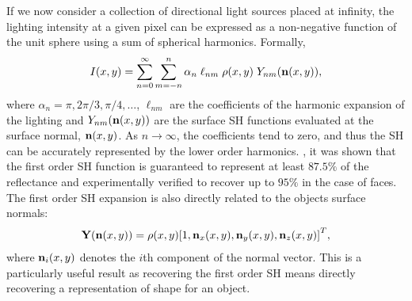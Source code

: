 If we now consider a collection of directional light sources placed at infinity,
the lighting intensity at a given pixel can be expressed as a non-negative
function of the unit sphere using a sum of spherical harmonics. Formally,
\begin{equation}\label{eq:spherical_harmonics}
    I(x, y) = \sum^{\infty}_{n=0} \sum^{n}_{m=-n} \alpha_n \; \ell_{nm} \; \rho(x,y) \; Y_{nm}(\boldsymbol{\mathbf{n}}(x,y)),
\end{equation}
where $\alpha_n = \pi, 2\pi/3, \pi/4, \ldots$, $\ell_{nm}$ are the coefficients
of the harmonic expansion of the lighting and $Y_{nm}(\boldsymbol{\mathbf{n}}(x,y))$ are the
surface SH functions evaluated at the surface normal, $\boldsymbol{\mathbf{n}}(x,y)$. As
$n \rightarrow \infty$, the coefficients tend to zero, and thus the SH can be
accurately represented by the lower order harmonics. \citet{frolova2004accuracy}, it
was shown that the first order SH function is guaranteed to represent at least
$87.5\%$ of the reflectance and experimentally verified to recover up to $95\%$
in the case of faces. The first order SH expansion is also directly related to
the objects surface normals:
\begin{equation}\label{eq:first_order_spherical_harmonics}
    \begin{aligned}
        \boldsymbol{\mathbf{Y}}(\boldsymbol{\mathbf{n}}(x, y))  = \rho(x, y) {[ 1, \boldsymbol{\mathbf{n}}_{x}(x, y), \boldsymbol{\mathbf{n}}_{y}(x, y), \boldsymbol{\mathbf{n}}_{z}(x, y) ]}^T,
   \end{aligned}
\end{equation}
where $\boldsymbol{\mathbf{n}}_{i}(x, y)$ denotes the $i$th component of the normal vector. 
This is a particularly useful result as recovering the first order SH means 
directly recovering a representation of shape for an object.
